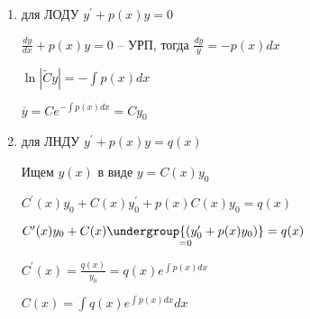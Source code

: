 \documentclass[12pt]{article}
\begin{document}
    \begin{enumerate}
        \item для ЛОДУ $y^\prime + p(x)y = 0$

        $\frac{dy}{dx} + p(x)y = 0$ -- УРП, тогда $\frac{dy}{y} = -p(x)dx$

        $\ln|\tilde{C}y| = -\int p(x)dx$

        $\overline{y} = Ce^{-\int p(x) dx} = Cy_0$

        \item для ЛНДУ $y^\prime + p(x)y = q(x)$

        Ищем $y(x)$ в виде $y = C(x)y_0$

        $C^\prime(x)y_0 + C(x)y^\prime_0 + p(x)C(x)y_0 = q(x)$

        $C^\prime(x)y_0 + C(x)\underset{=0}{\undergroup{(y^\prime_0 + p(x)y_0)}} = q(x)$

        $C^\prime(x) = \frac{q(x)}{y_0} = q(x)e^{\int p(x)dx}$

        $C(x) = \int q(x) e^{\int p(x)dx} dx$
    \end{enumerate}
\end{document}
